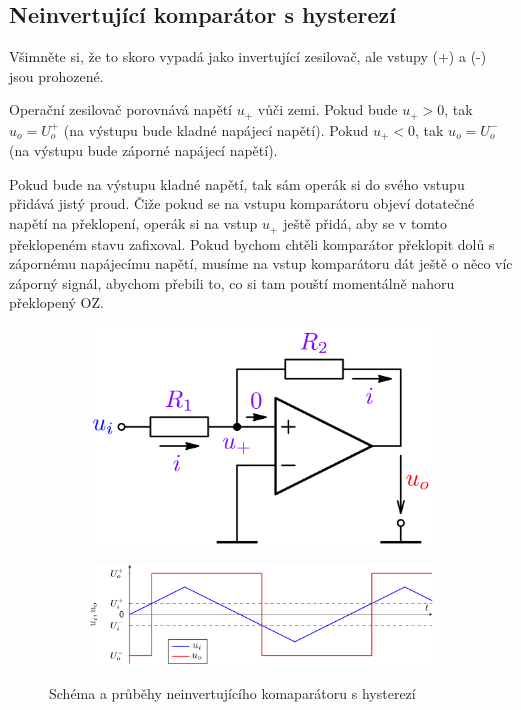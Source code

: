 \documentclass[a4paper,12pt]{article}   %
\begin{document}
\subsection*{Neinvertující komparátor s hysterezí}
Všimněte si, že to skoro vypadá jako invertující zesilovač, ale vstupy (+) a (-) jsou prohozené.

Operační zesilovač porovnává napětí $u_+$ vůči zemi. Pokud bude $u_+ > 0$, tak $u_o = U_o^+$ (na výstupu bude kladné napájecí napětí). Pokud $u_+ < 0$, tak $u_o = U_o^-$ (na výstupu bude záporné napájecí napětí).

Pokud bude na výstupu kladné napětí, tak sám operák si do svého vstupu přidává jistý proud. Čiže pokud se na vstupu komparátoru objeví dotatečné napětí na překlopení, operák si na vstup $u_+$ ještě přidá, aby se v tomto překlopeném stavu zafixoval. Pokud bychom chtěli komparátor překlopit dolů s zápornému napájecímu napětí, musíme na vstup komparátoru dát ještě o něco víc záporný signál, abychom přebili to, co si tam pouští momentálně nahoru překlopený OZ.

\begin{figure}[h!]
    \centering
    \begin{subfigure}{.3\textwidth}
        \centering
        \includegraphics[width=\textwidth]{komparator-noninvert.PNG}
    \end{subfigure}
    \begin{subfigure}{.65\textwidth}
        \centering
        \includegraphics[width=\textwidth]{komparator-noninvert-graf.PNG}
    \end{subfigure}
    \caption{Schéma a průběhy neinvertujícího komaparátoru s hysterezí}
\end{figure}
\end{document}
